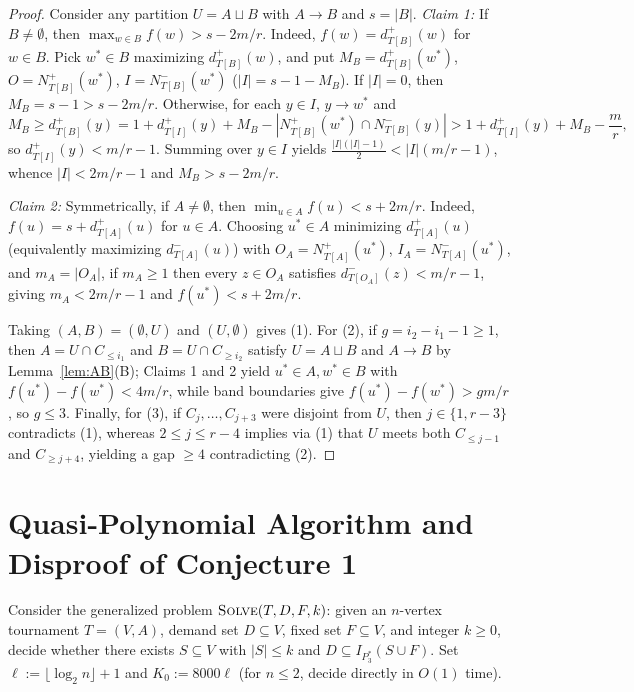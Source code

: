\documentclass[11pt]{article}
\theoremstyle{remark}
\begin{document}
\begin{proof}
Consider any partition $U = A \sqcup B$ with $A \to B$ and $s = |B|$.
\emph{Claim 1:} If $B \ne \emptyset$, then $\max_{w \in B} f(w) > s - 2m/r$. Indeed, $f(w) = d^+_{T[B]}(w)$ for $w \in B$. Pick $w^* \in B$ maximizing $d^+_{T[B]}(w)$, and put $M_B = d^+_{T[B]}(w^*)$, $O = N^+_{T[B]}(w^*)$, $I = N^-_{T[B]}(w^*)$ ($|I| = s - 1 - M_B$). If $|I| = 0$, then $M_B = s - 1 > s - 2m/r$. Otherwise, for each $y \in I$, $y \to w^*$ and
\[
  M_B \ge d^+_{T[B]}(y) = 1 + d^+_{T[I]}(y) + M_B - |N^+_{T[B]}(w^*) \cap N^-_{T[B]}(y)| > 1 + d^+_{T[I]}(y) + M_B - \frac{m}{r},
\]
so $d^+_{T[I]}(y) < m/r - 1$. Summing over $y \in I$ yields $\frac{|I|(|I|-1)}{2} < |I|(m/r - 1)$, whence $|I| < 2m/r - 1$ and $M_B > s - 2m/r$.

\emph{Claim 2:} Symmetrically, if $A \ne \emptyset$, then $\min_{u \in A} f(u) < s + 2m/r$. Indeed, $f(u) = s + d^+_{T[A]}(u)$ for $u \in A$. Choosing $u^* \in A$ minimizing $d^+_{T[A]}(u)$ (equivalently maximizing $d^-_{T[A]}(u)$) with $O_A = N^+_{T[A]}(u^*)$, $I_A = N^-_{T[A]}(u^*)$, and $m_A = |O_A|$, if $m_A \ge 1$ then every $z \in O_A$ satisfies $d^-_{T[O_A]}(z) < m/r - 1$, giving $m_A < 2m/r - 1$ and $f(u^*) < s + 2m/r$.

Taking $(A, B) = (\emptyset, U)$ and $(U, \emptyset)$ gives (1). For (2), if $g = i_2 - i_1 - 1 \ge 1$, then $A = U \cap C_{\le i_1}$ and $B = U \cap C_{\ge i_2}$ satisfy $U = A \sqcup B$ and $A \to B$ by Lemma~\ref{lem:AB}(B); Claims 1 and 2 yield $u^* \in A, w^* \in B$ with $f(u^*) - f(w^*) < 4m/r$, while band boundaries give $f(u^*) - f(w^*) > gm/r$, so $g \le 3$. Finally, for (3), if $C_j, \dots, C_{j+3}$ were disjoint from $U$, then $j \in \{1, r - 3\}$ contradicts (1), whereas $2 \le j \le r - 4$ implies via (1) that $U$ meets both $C_{\le j-1}$ and $C_{\ge j+4}$, yielding a gap $\ge 4$ contradicting (2).
\end{proof}

\section{Quasi-Polynomial Algorithm and Disproof of Conjecture 1}

Consider the generalized problem $\textsc{Solve}(T, D, F, k)$: given an $n$-vertex tournament $T = (V, A)$, demand set $D \subseteq V$, fixed set $F \subseteq V$, and integer $k \ge 0$, decide whether there exists $S \subseteq V$ with $|S| \le k$ and $D \subseteq I_{P_3^*}(S \cup F)$. Set $\ell := \lfloor \log_2 n \rfloor + 1$ and $K_0 := 8000 \ell$ (for $n \le 2$, decide directly in $O(1)$ time).
\end{document}
